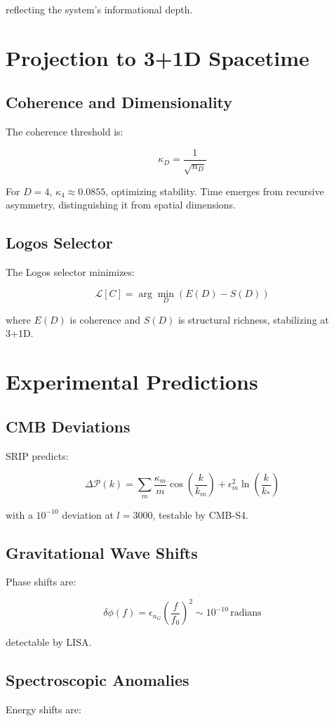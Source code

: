 \documentclass[12pt]{article}
\begin{document}
reflecting the system's informational depth.

\section{Projection to 3+1D Spacetime}
\subsection{Coherence and Dimensionality}
The coherence threshold is:

\[
\kappa_D = \frac{1}{\sqrt{n_D}}
\]

For \(D = 4\), \(\kappa_4 \approx 0.0855\), optimizing stability. Time emerges from recursive asymmetry, distinguishing it from spatial dimensions.

\subsection{Logos Selector}
The Logos selector minimizes:

\[
\mathcal{L}[C] = \arg\min_D (E(D) - S(D))
\]

where \(E(D)\) is coherence and \(S(D)\) is structural richness, stabilizing at 3+1D.

\section{Experimental Predictions}
\subsection{CMB Deviations}
SRIP predicts:

\[
\Delta \mathcal{P}(k) = \sum_m \frac{\kappa_m}{m} \cos\left(\frac{k}{k_m}\right) + \epsilon_m^2 \ln\left(\frac{k}{k_*}\right)
\]

with a \(10^{-10}\) deviation at \(l = 3000\), testable by CMB-S4.

\subsection{Gravitational Wave Shifts}
Phase shifts are:

\[
\delta \phi(f) = \epsilon_{n_G} \left( \frac{f}{f_0} \right)^2 \sim 10^{-10} \, \text{radians}
\]

detectable by LISA.

\subsection{Spectroscopic Anomalies}
Energy shifts are:
\end{document}
